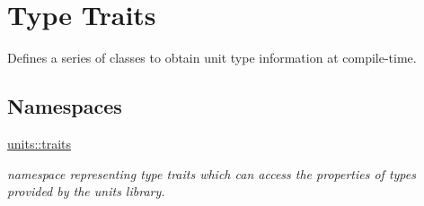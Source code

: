 \hypertarget{group___type_traits}{}\section{Type Traits}
\label{group___type_traits}


Defines a series of classes to obtain unit type information at compile-\/time.  


\subsection*{Namespaces}
\begin{DoxyCompactItemize}
\item 
 \hyperlink{namespaceunits_1_1traits}{units\+::traits}
\begin{DoxyCompactList}\small\item\em namespace representing type traits which can access the properties of types provided by the units library. \end{DoxyCompactList}\end{DoxyCompactItemize}
